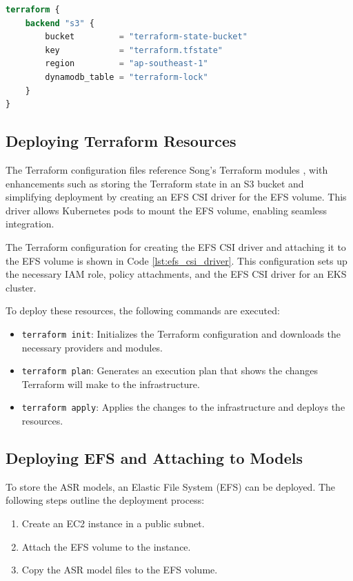 \begin{lstlisting}[language=Terraform, caption={Terraform Backend Configuration}, label={lst:backend_config}]
terraform {
    backend "s3" {
        bucket         = "terraform-state-bucket"
        key            = "terraform.tfstate"
        region         = "ap-southeast-1"
        dynamodb_table = "terraform-lock"
    }
}
\end{lstlisting}

\subsection{Deploying Terraform Resources}
The Terraform configuration files reference Song's Terraform modules \cite{song_yu}, with enhancements such as storing the Terraform state in an S3 bucket and simplifying deployment by creating an EFS CSI driver for the EFS volume. This driver allows Kubernetes pods to mount the EFS volume, enabling seamless integration.

The Terraform configuration for creating the EFS CSI driver and attaching it to the EFS volume is shown in Code \ref{lst:efs_csi_driver}. This configuration sets up the necessary IAM role, policy attachments, and the EFS CSI driver for an EKS cluster.

To deploy these resources, the following commands are executed:
\begin{itemize}
    \item \texttt{terraform init}: Initializes the Terraform configuration and downloads the necessary providers and modules.
    \item \texttt{terraform plan}: Generates an execution plan that shows the changes Terraform will make to the infrastructure.
    \item \texttt{terraform apply}: Applies the changes to the infrastructure and deploys the resources.
\end{itemize}

\subsection{Deploying EFS and Attaching to Models}
To store the ASR models, an Elastic File System (EFS) can be deployed. The following steps outline the deployment process:
\begin{enumerate}
    \item Create an EC2 instance in a public subnet.
    \item Attach the EFS volume to the instance.
    \item Copy the ASR model files to the EFS volume.
\end{enumerate}


